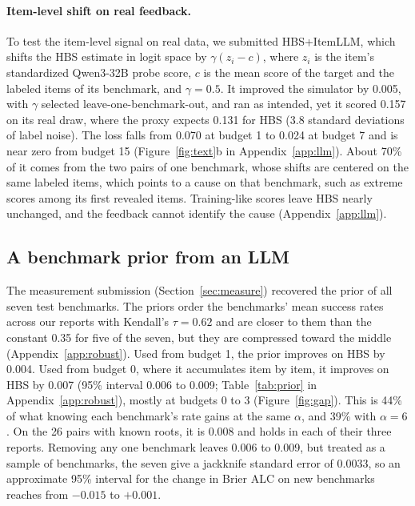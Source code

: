 \documentclass{article}
\begin{document}
\paragraph{Item-level shift on real feedback.}
\label{sec:itemllm}
To test the item-level signal on real data, we submitted HBS+ItemLLM, which shifts the HBS estimate in logit space by $\gamma(z_i - c)$, where $z_i$ is the item's standardized Qwen3-32B probe score, $c$ is the mean score of the target and the labeled items of its benchmark, and $\gamma = 0.5$. It improved the simulator by 0.005, with $\gamma$ selected leave-one-benchmark-out, and ran as intended, yet it scored 0.157 on its real draw, where the proxy expects 0.131 for HBS (3.8 standard deviations of label noise). The loss falls from 0.070 at budget 1 to 0.024 at budget 7 and is near zero from budget 15 (Figure~\ref{fig:text}b in Appendix~\ref{app:llm}). About 70\% of it comes from the two pairs of one benchmark, whose shifts are centered on the same labeled items, which points to a cause on that benchmark, such as extreme scores among its first revealed items. Training-like scores leave HBS nearly unchanged, and the feedback cannot identify the cause (Appendix~\ref{app:llm}).

\subsection{A benchmark prior from an LLM}
\label{sec:prior}

The measurement submission (Section~\ref{sec:measure}) recovered the prior of all seven test benchmarks. The priors order the benchmarks' mean success rates across our reports with Kendall's $\tau = 0.62$ and are closer to them than the constant 0.35 for five of the seven, but they are compressed toward the middle (Appendix~\ref{app:robust}). Used from budget 1, the prior improves on HBS by 0.004. Used from budget 0, where it accumulates item by item, it improves on HBS by 0.007 (95\% interval 0.006 to 0.009; Table~\ref{tab:prior} in Appendix~\ref{app:robust}), mostly at budgets 0 to 3 (Figure~\ref{fig:gap}). This is 44\% of what knowing each benchmark's rate gains at the same $\alpha$, and 39\% with $\alpha = 6$. On the 26 pairs with known roots, it is 0.008 and holds in each of their three reports. Removing any one benchmark leaves 0.006 to 0.009, but treated as a sample of benchmarks, the seven give a jackknife standard error of 0.0033, so an approximate 95\% interval for the change in Brier ALC on new benchmarks reaches from $-0.015$ to $+0.001$.
\end{document}
